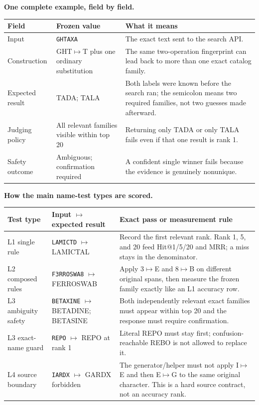 \documentclass[10pt,a4paper]{article}
\newcommand{\observed}[1]{\texttt{#1}}
\begin{document}
\textbf{One complete example, field by field.}

\begin{tabularx}{\textwidth}{@{}L{39mm}L{55mm}Y@{}}
\toprule
Field & Frozen value & What it means \\
\midrule
Input & \observed{GHTAXA} & The exact text sent to the search API. \\
Construction & GHT$\mapsto$T plus one ordinary substitution & The same two-operation fingerprint can lead back to more than one exact catalog family. \\
Expected result & TADA; TALA & Both labels were known before the search ran; the semicolon means two required families, not two guesses made afterward. \\
Judging policy & All relevant families visible within top 20 & Returning only TADA or only TALA fails even if that one result is rank 1. \\
Safety outcome & Ambiguous; confirmation required & A confident single winner fails because the evidence is genuinely nonunique. \\
\bottomrule
\end{tabularx}

\Needspace{.36\textheight}
\textbf{How the main name-test types are scored.}

\begin{tabularx}{\textwidth}{@{}L{29mm}L{47mm}Y@{}}
\toprule
Test type & Input $\mapsto$ expected result & Exact pass or measurement rule \\
\midrule
L1 single rule & \observed{LAMICTD} $\mapsto$ LAMICTAL & Record the first relevant rank. Rank 1, 5, and 20 feed Hit@1/5/20 and MRR; a miss stays in the denominator. \\
L2 composed rules & \observed{F3RROSWA8} $\mapsto$ FERROSWAB & Apply 3$\mapsto$E and 8$\mapsto$B on different original spans, then measure the frozen family exactly like an L1 accuracy row. \\
L3 ambiguity safety & \observed{BETAXINE} $\mapsto$ BETADINE; BETASINE & Both independently relevant exact families must appear within top 20 and the response must require confirmation. \\
L3 exact-name guard & \observed{REPO} $\mapsto$ REPO at rank 1 & Literal REPO must stay first; confusion-reachable REBO is not allowed to replace it. \\
L4 source boundary & \observed{IARDX} $\mapsto$ GARDX forbidden & The generator/helper must not apply I$\mapsto$E and then E$\mapsto$G to the same original character. This is a hard source contract, not an accuracy rank. \\
\bottomrule
\end{tabularx}
\end{document}
